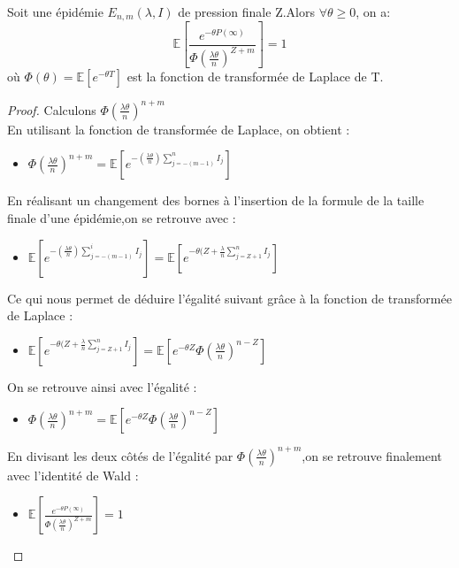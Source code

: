\begin{theorem}
Soit une épidémie $E_{n,m}(\lambda, I)$ de pression finale Z.Alors $ \forall \theta \geq 0$, on a:\\

$$\mathbb{E}[ \frac{ e^{-\theta P(\infty)} }{ \Phi( \frac{\lambda \theta}{n})^{Z + m} } ] = 1 $$
où $ \Phi(\theta) = \mathbb{E}[e^{-\theta T}] $ est la fonction de transformée de Laplace de T.
\end{theorem}

\begin{proof}
Calculons $ \Phi( \frac{\lambda \theta}{n})^{n + m}$\\

En utilisant la fonction de transformée de Laplace, on obtient :
	\begin{itemize}[label=$\bullet$]
	\item $ \Phi( \frac{\lambda \theta}{n})^{n + m} = \mathbb{E}[e^{-(\frac{\lambda \theta}{n}) \sum^n_{j = - (m-1)} I_j }]$
	\end{itemize}
En réalisant un changement des bornes à l'insertion de la formule de la taille finale d'une épidémie,on se retrouve avec :
	\begin{itemize}[label=$\bullet$]
	\item  $ \mathbb{E}[e^{-(\frac{\lambda \theta}{n}) \sum^i_{j = - (m-1)} I_j }]= \mathbb{E}[e^{- \theta(Z+\frac{\lambda}{n} \sum^n_{j = Z+1} I_j }]$
	\end{itemize}
Ce qui nous permet de déduire l'égalité suivant grâce à la fonction de transformée de Laplace :
	\begin{itemize}[label=$\bullet$]
	\item $\mathbb{E}[e^{- \theta(Z+\frac{\lambda}{n} \sum^n_{j = Z+1} I_j }]=\mathbb{E}[e^{- \theta Z}\Phi( \frac{\lambda \theta}{n})^{n - Z}]$
	\end{itemize}	
On se retrouve ainsi avec l'égalité :	
	\begin{itemize}[label=$\bullet$]
	\item $\Phi( \frac{\lambda \theta}{n})^{n + m} =\mathbb{E}[e^{- \theta Z}\Phi( \frac{\lambda \theta}{n})^{n - Z}] $
	\end{itemize}
En divisant les deux côtés de l'égalité par $\Phi( \frac{\lambda \theta}{n})^{n + m}$,on se retrouve finalement avec l'identité de Wald :
	\begin{itemize}[label=$\bullet$]
	\item $\mathbb{E}[ \frac{ e^{-\theta P(\infty)} }{ \Phi( \frac{\lambda \theta}{n})^{Z + m} } ] = 1$
	\end{itemize}	
\end{proof}

